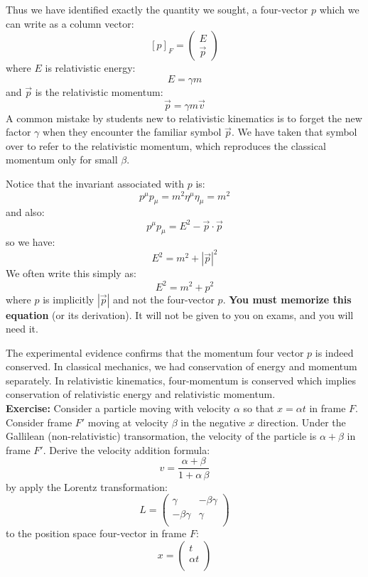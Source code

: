 \documentclass[12pt]{article}
\begin{document}
Thus we have identified exactly the quantity we sought, a four-vector
$p$ which we can write as a column vector:
$$[p]_{F} = \begin{pmatrix} E \\ \vec{p} \end{pmatrix}$$
where $E$ is relativistic energy:
$$E = \gamma m $$
and $\vec{p}$ is the relativistic momentum:
$$\vec{p} = \gamma m \vec{v}$$
A common mistake by students new to relativistic kinematics is to
forget the new factor $\gamma$ when they encounter the familiar symbol
$\vec{p}$.  We have taken that symbol over to refer to the
relativistic momentum, which reproduces the classical momentum only
for small $\beta$.

Notice that the invariant associated with $p$ is:
$$p^\mu p_\mu = m^2 \eta^\mu \eta_\mu = m^2 $$
and also:
$$p^\mu p_\mu = E^2 - \vec{p}\cdot\vec{p}$$
so we have:
\begin{equation}
E^2 = m^2 + |\vec{p}|^2
\end{equation}
We often write this simply as:
\begin{equation}
E^2 = m^2 + p^2
\end{equation}
where $p$ is implicitly $|\vec{p}|$ and not the four-vector $p$.
{\bf You must memorize this equation} (or its derivation).  It will
not be given to you on exams, and you will need it.

The experimental evidence confirms that the momentum four vector $p$
is indeed conserved.  In classical mechanics, we had conservation of
energy and momentum separately.  In relativistic kinematics,
four-momentum is conserved which implies conservation of relativistic
energy and relativistic momentum.\\[5pt]

\noindent
{\bf Exercise:} Consider a particle moving with velocity $\alpha$ so
that $x = \alpha t$ in frame $F$.  Consider frame $F'$ moving at
velocity $\beta$ in the negative $x$ direction.  Under the Gallilean
(non-relativistic) transormation, the velocity of the particle is
$\alpha + \beta$ in frame $F'$.  Derive the velocity addition formula:
\begin{equation*}
v = \frac{\alpha + \beta}{1 + \alpha \, \beta}
\end{equation*}
by apply the Lorentz transformation:
\begin{equation*}
  L = \begin{pmatrix}
  \gamma & -\beta\gamma \\[3pt]
  -\beta\gamma & \gamma \\[3pt]
  \end{pmatrix}
\end{equation*}
to the position space four-vector in frame $F$:
\begin{equation*}
  x = \begin{pmatrix}
  t \\[3pt]
  \alpha t \\[3pt]
  \end{pmatrix}
\end{equation*}
\end{document}
